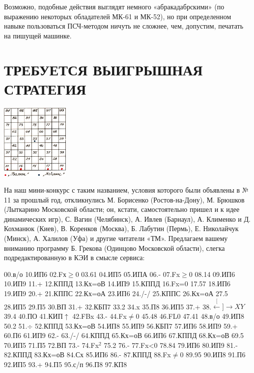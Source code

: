 \documentclass[11pt,a4paper,oneside]{article}
\def\XY{$\stackrel[\leftarrow]{\rightarrow}{XY}$}
\begin{document}
Возможно, подобные действия выглядят немного «абракадабрскими» (по выражению некоторых обладателей МК-61 и МК-52), но при определенном навыке пользоваться ПСЧ-методом ничуть не сложнее, чем, допустим, печатать на пишущей машинке.

\section{ТРЕБУЕТСЯ ВЫИГРЫШНАЯ СТРАТЕГИЯ}

\includegraphics[width=0.25\textwidth]{win_strategy2}

На наш мини-конкурс с таким названием, условия которого были объявлены в № 11 за прошлый год, откликнулись М. Борисенко (Ростов-на-Дону), М. Брюшков (Лыткарино Московской области; он, кстати, самостоятельно пришел и к идее динамических игр), С. Вагин (Челябинск), А. Ивлев (Барнаул), А. Клименко и Д. Кохманюк (Киев), В. Коренков (Москва), Б. Лабутин (Пермь), Е. Николайчук (Минск), А. Халилов (Уфа) и другие читатели «ТМ». Предлагаем вашему вниманию программу Б. Грекова (Одинцово Московской области), слегка подредактированную в КЭИ в смысле сервиса:

00.в/о 10.ИП6 02.Fх$\geq$0 03.61 04.ИП5 05.ИПА 06.- 07.Fx$\geq$0 08.14 09.ИП6 10.ИП9 11.+ 12.КППД 13.Кх=оВ 14.ИП9 15.КППД 16.Fx=0 17.57 18.ИП6 19.ИП9 20.+ 21.КППС 22.Кх=оА 23.ИП6 24./-/ 25.КППС 26.Кх=оА 27.5 28.ИП5 29.П5 30.ВП 31.+ 32.КБП7 33.2 34.x 35.П8 36.ИП5 37.+ 38.\XY 39.4 40.ПО 41.КИП$\uparrow$ 42.FBx 43.- 44.Fx$\neq$0 45.48 46.FL0 47.41 48.в/о 49.ИП8 50.2 51.$\div$ 52.КППД 53.Кх=оВ 54.ИП8 55.ИП9 56.КБП7 57.ИП6 58.ИП9 59.+ 60.П6 61.ИП9 62.- 63./-/ 64.КППД 65.Кх=оВ 66.ИП6 67.КППД 68.Кх=оВ 69.5 70.ИП5 71.П5 72.ВП 73.- 74.Fx$^{2}$ 75.2 76.- 77.Fx<0 78.84 79.ИП6 80.ИП9 81.- 82.КППД 83.Кх=оВ 84.Сх 85.ИП6 86.- 87.КППД 88.Fx$\neq$0 89.95 90.ИП8 91.П6 92.ИП5 93.+ 94.П5 95.с/п 96.П8 97.КП8
\end{document}
